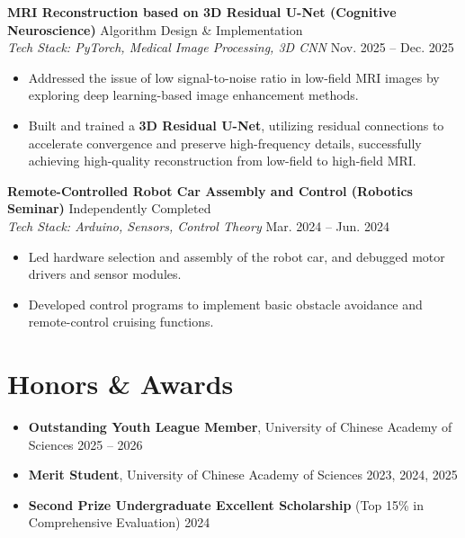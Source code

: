 \documentclass[11pt,a4paper]{article}
\begin{document}
\textbf{MRI Reconstruction based on 3D Residual U-Net (Cognitive Neuroscience)} \hfill Algorithm Design \& Implementation \\
\textit{Tech Stack: PyTorch, Medical Image Processing, 3D CNN} \hfill Nov. 2025 -- Dec. 2025
\begin{itemize}
    \item Addressed the issue of low signal-to-noise ratio in low-field MRI images by exploring deep learning-based image enhancement methods.
    \item Built and trained a \textbf{3D Residual U-Net}, utilizing residual connections to accelerate convergence and preserve high-frequency details, successfully achieving high-quality reconstruction from low-field to high-field MRI.
\end{itemize}

\textbf{Remote-Controlled Robot Car Assembly and Control (Robotics Seminar)} \hfill Independently Completed \\
\textit{Tech Stack: Arduino, Sensors, Control Theory} \hfill Mar. 2024 -- Jun. 2024
\begin{itemize}
    \item Led hardware selection and assembly of the robot car, and debugged motor drivers and sensor modules.
    \item Developed control programs to implement basic obstacle avoidance and remote-control cruising functions.
\end{itemize}

\section{Honors \& Awards}
\begin{itemize}
    \item \textbf{Outstanding Youth League Member}, University of Chinese Academy of Sciences \hfill 2025 -- 2026
    \item \textbf{Merit Student}, University of Chinese Academy of Sciences \hfill 2023, 2024, 2025
    \item \textbf{Second Prize Undergraduate Excellent Scholarship} (Top 15\% in Comprehensive Evaluation) \hfill 2024
\end{itemize}

\end{document}
